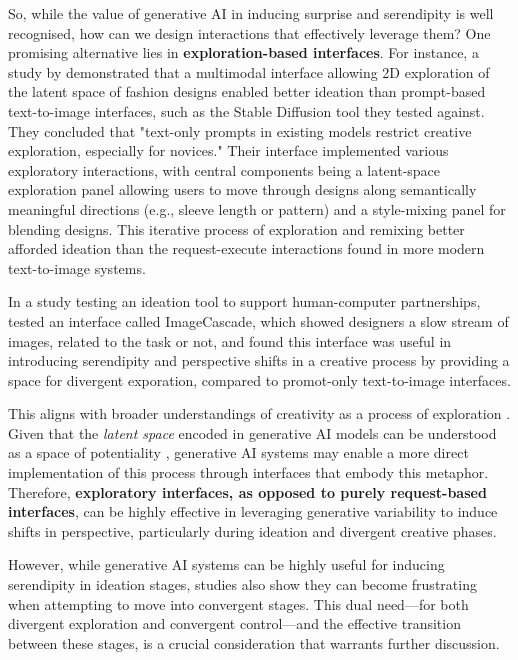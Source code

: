 So, while the value of generative AI in inducing surprise and serendipity is well recognised, how can we design interactions that effectively leverage them? One promising alternative lies in \textbf{exploration-based interfaces}. For instance, a study by \cite{Davis2024-ml} demonstrated that a multimodal interface allowing 2D exploration of the latent space of fashion designs enabled better ideation than prompt-based text-to-image interfaces, such as the Stable Diffusion tool they tested against. They concluded that "text-only prompts in existing models restrict creative exploration, especially for novices." Their interface implemented various exploratory interactions, with central components being a latent-space exploration panel allowing users to move through designs along semantically meaningful directions (e.g., sleeve length or pattern) and a style-mixing panel for blending designs. This iterative process of exploration and remixing better afforded ideation than the request-execute interactions found in more modern text-to-image systems. 

In a study testing an ideation tool to support human-computer partnerships, \cite{Koch2020-gx} tested an interface called ImageCascade, which showed designers a slow stream of images, related to the task or not, and found this interface was useful in introducing serendipity and perspective shifts in a creative process by providing a space for divergent exporation, compared to promot-only text-to-image interfaces.

This aligns with broader understandings of creativity as a process of exploration \cite{Boden1998-yn, Wiggins2019-yj}. Given that the \textit{latent space} encoded in generative AI models can be understood as a space of potentiality \cite{Schaerf2024-gf}, generative AI systems may enable a more direct implementation of this process through interfaces that embody this metaphor. Therefore, \textbf{exploratory interfaces, as opposed to purely request-based interfaces}, can be highly effective in leveraging generative variability to induce shifts in perspective, particularly during ideation and divergent creative phases. 

However, while generative AI systems can be highly useful for inducing serendipity in ideation stages, studies also show they can become frustrating when attempting to move into convergent stages. This dual need—for both divergent exploration and convergent control—and the effective transition between these stages, is a crucial consideration that warrants further discussion.

